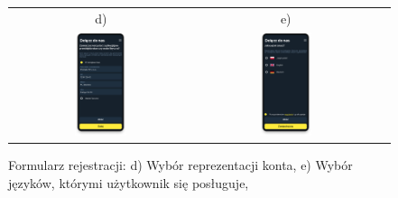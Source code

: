 \begin{figure}[H]
 \centering
  \begin{tabular}{@{}ccc@{}}
  d) & e)\\
  \includegraphics[width=0.3\textwidth]{rozdzial1/wybor_2.png} &
  \includegraphics[width=0.3\textwidth]{rozdzial1/wybor_3.png} &
  \end{tabular}
 \caption{Formularz rejestracji: d) Wybór reprezentacji konta, e) Wybór języków, którymi użytkownik się posługuje, }
 \label{fig:Formularz rejestracji - de}
\end{figure}

